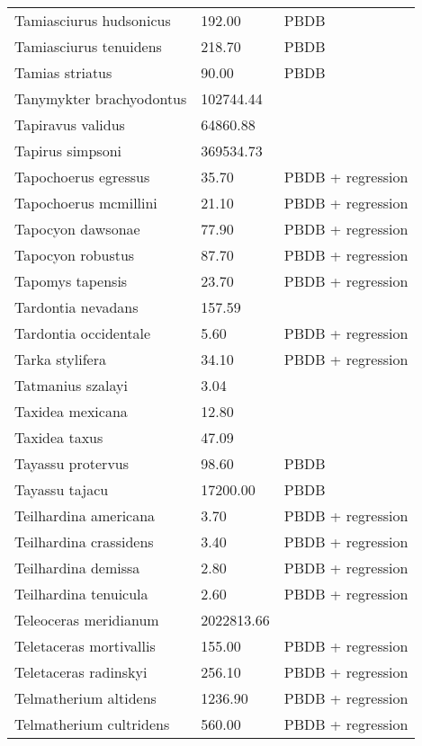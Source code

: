 \begin{longtable}{p{} p{} p{}}
    Tamiasciurus hudsonicus & 192.00 & PBDB \\ 
    Tamiasciurus tenuidens & 218.70 & PBDB \\ 
    Tamias striatus & 90.00 & PBDB \\ 
    Tanymykter brachyodontus & 102744.44 & \cite{Tomiya2013} \\ 
    Tapiravus validus & 64860.88 & \cite{Tomiya2013} \\ 
    Tapirus simpsoni & 369534.73 & \cite{Tomiya2013} \\ 
    Tapochoerus egressus & 35.70 & PBDB + regression \\ 
    Tapochoerus mcmillini & 21.10 & PBDB + regression \\ 
    Tapocyon dawsonae & 77.90 & PBDB + regression \\ 
    Tapocyon robustus & 87.70 & PBDB + regression \\ 
    Tapomys tapensis & 23.70 & PBDB + regression \\ 
    Tardontia nevadans & 157.59 & \cite{Tomiya2013} \\ 
    Tardontia occidentale & 5.60 & PBDB + regression \\ 
    Tarka stylifera & 34.10 & PBDB + regression \\ 
    Tatmanius szalayi & 3.04 & \cite{Ferrusquia-Villafranca2006} \\ 
    Taxidea mexicana & 12.80 & \cite{Bloch2007} \\ 
    Taxidea taxus & 47.09 & \cite{Smith2004} \\ 
    Tayassu protervus & 98.60 & PBDB \\ 
    Tayassu tajacu & 17200.00 & PBDB \\ 
    Teilhardina americana & 3.70 & PBDB + regression \\ 
    Teilhardina crassidens & 3.40 & PBDB + regression \\ 
    Teilhardina demissa & 2.80 & PBDB + regression \\ 
    Teilhardina tenuicula & 2.60 & PBDB + regression \\ 
    Teleoceras meridianum & 2022813.66 & \cite{Tomiya2013} \\ 
    Teletaceras mortivallis & 155.00 & PBDB + regression \\ 
    Teletaceras radinskyi & 256.10 & PBDB + regression \\ 
    Telmatherium altidens & 1236.90 & PBDB + regression \\ 
    Telmatherium cultridens & 560.00 & PBDB + regression \\ 

\end{longtable}
